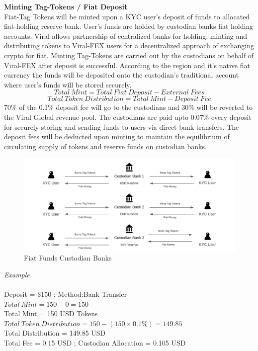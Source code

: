 \documentclass[conference]{IEEEtran}
\begin{document}
\textbf{Minting Tag-Tokens / Fiat Deposit}\\
Fiat-Tag Tokens will be minted upon a KYC user's deposit of funds to allocated fiat-holding reserve bank. User's funds are holded by custodian banks fiat holding accounts. Viral allows partnership of centralized banks for holding, minting and distributing tokens to Viral-FEX users for a decentralized approach of exchanging crypto for fiat. Minting Tag-Tokens are carried out by the  custodians on behalf of Viral-FEX after deposit is successful. According to the region and it's native fiat currency the funds will be deposited onto the custodian's traditional account where user's funds will be stored securely.\\
\[Total\:Mint=Total\:Fiat\:Deposit-External\:Fees\]
\[Total\:Token\:Distribution=Total\:Mint-Deposit\:Fee\]
70\% of the 0.1\% deposit fee will go to the custodians and 30\% will be reverted to the Viral Global revenue pool. The custodians are paid upto 0.07\% every deposit for securely storing and sending funds to users via direct bank transfers. The deposit fees will be deducted upon minting to maintain the equilibrium of circulating supply of tokens and reserve funds on custodian banks.\\

\begin{figure}
\begin{center}
\includegraphics[width=12cm]{custodian}
\caption{Fiat Funds Custodian Banks}
\end{center}
\end{figure}

\textit{Example}\\\\
Deposit = \$150 ; Method:Bank Transfer\\
$Total\:Mint=150-0 = 150$\\
Total Mint = 150 USD Tokens\\
$Total\:Token\:Distribution=150-(150 \times 0.1\%)=149.85$\\
Total Distribution = 149.85 USD\\
Total Fee = 0.15 USD ; Custodian Allocation = 0.105 USD\\
\end{document}

